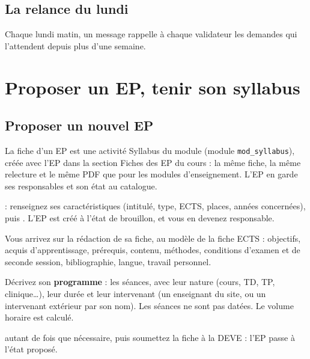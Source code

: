 \documentclass[11pt,a4paper]{article}
\begin{document}

\subsection{La relance du lundi}

Chaque lundi matin, un message rappelle à chaque validateur les demandes qui l'attendent depuis
plus d'une semaine.

\section{Proposer un EP, tenir son syllabus}\label{sec:auteur}

\subsection{Proposer un nouvel EP}

La fiche d'un EP est une activité \og Syllabus du module\fg{} (module \texttt{mod\_syllabus}),
créée avec l'EP dans la section \og Fiches des EP\fg{} du cours : la même fiche, la même
relecture et le même PDF que pour les modules d'enseignement. L'EP en garde ses responsables et
son état au catalogue.

\begin{etapes}
  \item {} : renseignez ses
    caractéristiques (intitulé, type, ECTS, places, années concernées), puis . L'EP est créé à l'état de brouillon, et vous en devenez responsable.
  \item Vous arrivez sur la rédaction de sa fiche, au modèle de la fiche ECTS : objectifs,
    acquis d'apprentissage, prérequis, contenu, méthodes, conditions d'examen et de seconde
    session, bibliographie, langue, travail personnel.
  \item Décrivez son \textbf{programme} : les séances, avec leur nature (cours, TD, TP,
    clinique\dots), leur durée et leur intervenant (un enseignant du site, ou un intervenant
    extérieur par son nom). Les séances ne sont pas datées. Le volume horaire est calculé.
  \item {} autant de fois que nécessaire, puis soumettez la fiche
    à la DEVE : l'EP passe à l'état \og proposé\fg{}.
\end{etapes}
\end{document}
